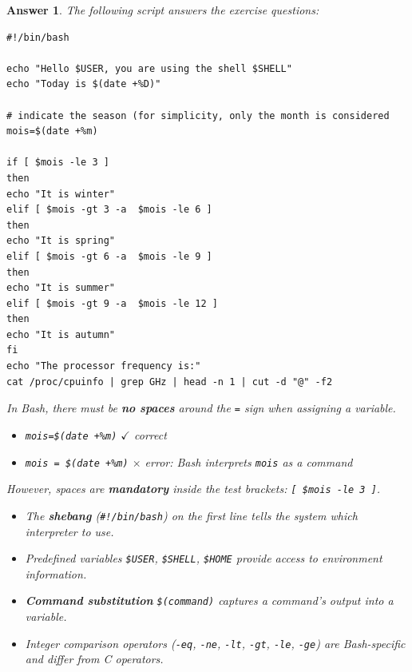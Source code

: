 \documentclass[a4paper,11pt]{article}
\theoremstyle{plain}
\newtheorem{correction}{Answer}
\theoremstyle{definition}
\begin{document}
\begin{correction}
The following script answers the exercise questions:
\begin{lstlisting}
#!/bin/bash

echo "Hello $USER, you are using the shell $SHELL"
echo "Today is $(date +%D)"

# indicate the season (for simplicity, only the month is considered
mois=$(date +%m)

if [ $mois -le 3 ]
then
echo "It is winter"
elif [ $mois -gt 3 -a  $mois -le 6 ]
then
echo "It is spring"
elif [ $mois -gt 6 -a  $mois -le 9 ]
then
echo "It is summer"
elif [ $mois -gt 9 -a  $mois -le 12 ]
then
echo "It is autumn"
fi
echo "The processor frequency is:"
cat /proc/cpuinfo | grep GHz | head -n 1 | cut -d "@" -f2
\end{lstlisting}

\begin{attention}
In Bash, there must be \textbf{no spaces} around the \texttt{=} sign when assigning a variable.
\begin{itemize}
    \item \texttt{mois=\$(date +\%m)} \quad $\checkmark$ \quad correct
    \item \texttt{mois = \$(date +\%m)} \quad $\times$ \quad error: Bash interprets \texttt{mois} as a command
\end{itemize}
However, spaces are \textbf{mandatory} inside the test brackets: \texttt{[ \$mois -le 3 ]}.
\end{attention}

\begin{pointcle}
\begin{itemize}
    \item The \textbf{shebang} (\texttt{\#!/bin/bash}) on the first line tells the system which interpreter to use.
    \item Predefined variables \texttt{\$USER}, \texttt{\$SHELL}, \texttt{\$HOME} provide access to environment information.
    \item \textbf{Command substitution} \texttt{\$(command)} captures a command's output into a variable.
    \item Integer comparison operators (\texttt{-eq}, \texttt{-ne}, \texttt{-lt}, \texttt{-gt}, \texttt{-le}, \texttt{-ge}) are Bash-specific and differ from C operators.
\end{itemize}
\end{pointcle}

\end{correction}
\end{document}

